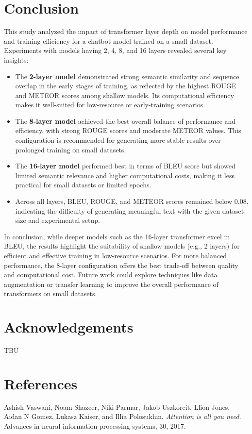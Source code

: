 \documentclass[11pt]{article}
\begin{document}
\section{Conclusion}
This study analyzed the impact of transformer layer depth on model performance and training efficiency for a chatbot model trained on a small dataset. Experiments with models having 2, 4, 8, and 16 layers revealed several key insights:

\begin{itemize}
    \item The \textbf{2-layer model} demonstrated strong semantic similarity and sequence overlap in the early stages of training, as reflected by the highest ROUGE and METEOR scores among shallow models. Its computational efficiency makes it well-suited for low-resource or early-training scenarios.
    \item The \textbf{8-layer model} achieved the best overall balance of performance and efficiency, with strong ROUGE scores and moderate METEOR values. This configuration is recommended for generating more stable results over prolonged training on small datasets.
    \item The \textbf{16-layer model} performed best in terms of BLEU score but showed limited semantic relevance and higher computational costs, making it less practical for small datasets or limited epochs.
    \item Across all layers, BLEU, ROUGE, and METEOR scores remained below 0.08, indicating the difficulty of generating meaningful text with the given dataset size and experimental setup.
\end{itemize}

In conclusion, while deeper models such as the 16-layer transformer excel in BLEU, the results highlight the suitability of shallow models (e.g., 2 layers) for efficient and effective training in low-resource scenarios. For more balanced performance, the 8-layer configuration offers the best trade-off between quality and computational cost. Future work could explore techniques like data augmentation or transfer learning to improve the overall performance of transformers on small datasets.

\section{Acknowledgements}
TBU

\section{References}
Ashish Vaswani, Noam Shazeer, Niki Parmar, Jakob Uszkoreit, Llion Jones, Aidan N Gomez, Lukasz Kaiser, and Illia Polosukhin.
\textit{Attention is all you need.}
Advances in neural information processing systems, 30, 2017.
\end{document}
